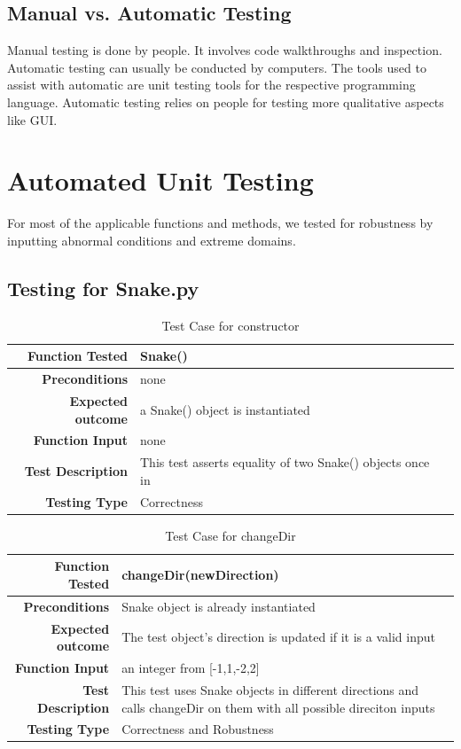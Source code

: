 \documentclass[12pt]{article}
\begin{document}
\subsection{Manual vs. Automatic Testing}
Manual testing is done by people. It involves code walkthroughs and inspection. \newline\newline
Automatic testing can usually be conducted by computers. The tools used to assist with automatic are unit testing tools for the respective programming language. Automatic testing relies on people for testing more qualitative aspects like GUI. 


\section{Automated Unit Testing}
For most of the applicable functions and methods, we tested for robustness by inputting abnormal conditions and extreme domains.
\subsection{Testing for Snake.py}
\begin{center}
	\begin{longtable}{ | r | p{4cm} | p{10cm} }
	\caption{Test Case for constructor} \\ \hline \label{TblInputVar} 
	\textbf{Function Tested} & Snake()\\ \hline
	\textbf{Preconditions} & none \\ \hline
	\textbf{Expected outcome} & a Snake() object is instantiated \\ \hline
	\textbf{Function Input} & none \\ \hline
	\textbf{Test Description} & This test asserts equality of two Snake() objects once in\\ \hline
	\textbf{Testing Type} & Correctness\\ \hline
	
	\end{longtable}
\end{center}

\begin{center}
	\begin{longtable}{ | r | p{4cm} | p{10cm} }
	\caption{Test Case for changeDir} \\ \hline \label{TblInputVar} 
	\textbf{Function Tested} & changeDir(newDirection)\\ \hline
	\textbf{Preconditions} & Snake object is already instantiated \\ \hline
	\textbf{Expected outcome} & The test object's direction is updated if it is a valid input \\ \hline
	\textbf{Function Input} & an integer from [-1,1,-2,2] \\ \hline
	\textbf{Test Description} & This test uses Snake objects in different directions and calls changeDir on them with all possible direciton inputs\\ \hline
	\textbf{Testing Type} & Correctness and Robustness\\ \hline
	
	\end{longtable}
\end{center}
\end{document}
